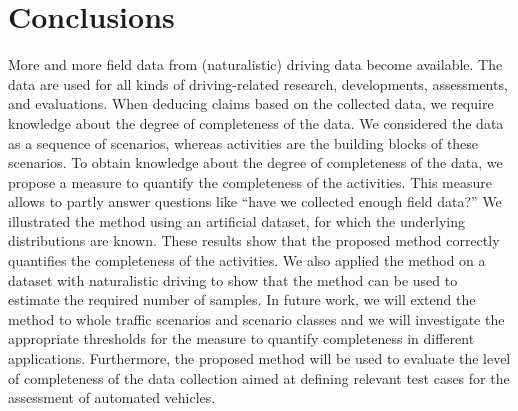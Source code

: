 \section{Conclusions}
\label{sec:conclusion}

More and more field data from (naturalistic) driving data become available. The data are used for all kinds of driving-related research, developments, assessments, and evaluations. When deducing claims based on the collected data, we require knowledge about the degree of completeness of the data. 
We considered the data as a sequence of scenarios, whereas activities are the building blocks of these scenarios. To obtain knowledge about the degree of completeness of the data, we propose a measure to quantify the completeness of the activities. This measure allows to partly answer questions like ``have we collected enough field data?'' 
We illustrated the method using an artificial dataset, for which the underlying distributions are known. These results show that the proposed method correctly quantifies the completeness of the activities. We also applied the method on a dataset with naturalistic driving to show that the method can be used to estimate the required number of samples.
In future work, we will extend the method to whole traffic scenarios and scenario classes \cstart and we will investigate the appropriate thresholds for the measure to quantify completeness in different applications. Furthermore, the proposed method will be used to evaluate the level of completeness of the data collection aimed at defining relevant test cases for the assessment of automated vehicles.\cend
